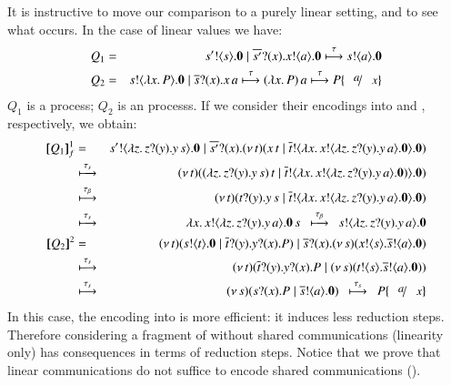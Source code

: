 It is instructive to move our comparison 
to a purely linear setting, and to see what occurs. 
In the case of linear values we have:
\begin{eqnarray*}
	Q_1 & = & \bout{s'}{s} \inact \Par \binp{\dual{s'}}{x} \bout{x}{a} \inact
	\hby{\tau}
	\bout{s}{a} \inact \\
	Q_2 & = & \bout{s}{\abs{x}{P}} \inact \Par \binp{\dual{s}}{x} \appl{x}{a}
	\hby{\tau}
	\appl{(\abs{x}{P})}{a}
	\hby{\tau}
	P \subst{a}{x}
\end{eqnarray*}
$Q_1$ is a \sessp process; $Q_2$ is an \HO processs.
If we consider their encodings into \HO and \sessp, respectively,
we obtain:
\begin{eqnarray*}
	\map{Q_1}_f^{1} & = & \bout{s'}{\abs{z}{\binp{z}{y} \appl{y}{s}}} \inact \Par \binp{\dual{s'}}{x} \newsp{t}{\appl{x}{t} \Par \bout{\dual{t}}{\abs{x}{\bout{x}{\abs{z}{\binp{z}{y} \appl{y}{a}}} \inact}} \inact}\\
	& \hby{\stau} & 
	\newsp{t}{\appl{(\abs{z}{\binp{z}{y} \appl{y}{s}})}{t} \Par \bout{\dual{t}}{\abs{x}{\bout{x}{\abs{z}{\binp{z}{y} \appl{y}{a}}} \inact)}} \inact}\\
	& \hby{\btau} & 
	\newsp{t}{\binp{t}{y} \appl{y}{s} \Par \bout{\dual{t}}{\abs{x}{\bout{x}{\abs{z}{\binp{z}{y} \appl{y}{a}}} \inact}} \inact}\\
	& \hby{\stau} & 
	\appl{\abs{x}{\bout{x}{\abs{z}{\binp{z}{y} \appl{y}{a}}} \inact}}{s}
	~~\hby{\btau}~~
	\bout{s}{\abs{z}{\binp{z}{y} \appl{y}{a}}} \inact \\
	\pmap{Q_2}{2} & = & \newsp{t}{\bout{s}{t} \inact \Par \binp{\dual{t}}{y} \binp{y}{x} P} \Par \binp{\dual{s}}{x} \newsp{s}{\bout{x}{s} \bout{\dual{s}}{a} \inact}
	\\
	& \hby{\stau} & 
	\newsp{t}{\binp{\dual{t}}{y} \binp{y}{x} P \Par \newsp{s}{\bout{t}{s} \bout{\dual{s}}{a} \inact}}
	\\
	& \hby{\stau} & 
	\newsp{s}{\binp{s}{x} P \Par \bout{\dual{s}}{a} \inact}
	~~
	\hby{\stau} ~~
	P\subst{a}{x}
\end{eqnarray*}
\noi In this case, the encoding into \sessp is more efficient: it induces less reduction steps.
Therefore considering a fragment of \HOp without shared communications (linearity only)
has consequences in terms of reduction steps. Notice that we prove that linear communications do 
not suffice to encode shared communications ().

